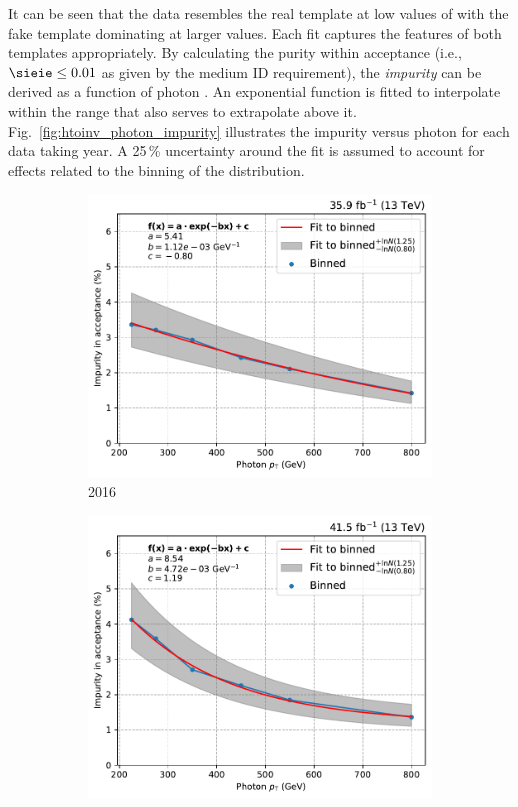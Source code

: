 It can be seen that the data resembles the real template at low values of \sieie with the fake template dominating at larger values. Each fit captures the features of both templates appropriately. By calculating the purity within acceptance (i.e., $\sieie \leq \text{0.01}$ as given by the medium ID requirement), the \emph{impurity} can be derived as a function of photon \pt. An exponential function is fitted to interpolate within the range that also serves to extrapolate above it. Fig.~\ref{fig:htoinv_photon_impurity} illustrates the impurity versus photon \pt for each data taking year. A 25\,\% uncertainty around the fit is assumed to account for effects related to the binning of the \sieie distribution.

\begin{figure}[htbp]
    \centering
    \begin{subfigure}[b]{0.49\textwidth}
        \includegraphics[width=\textwidth]{figures/photon_purity/2016/impurity_plot_2016.pdf}
        \caption{2016}
    \end{subfigure}
    \hfill
    \begin{subfigure}[b]{0.49\textwidth}
        \includegraphics[width=\textwidth]{figures/photon_purity/2017/impurity_plot_2017.pdf}

\end{subfigure}
\end{figure}
